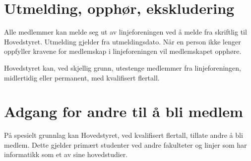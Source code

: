 \section{Utmelding, opphør, ekskludering}
\vspace{23pt}
Alle medlemmer kan melde seg ut av linjeforeningen ved å melde fra skriftlig til Hovedstyret. Utmelding gjelder fra utmeldingsdato. Når en person ikke lenger oppfyller kravene for medlemskap i linjeforeningen vil medlemskapet opphøre.

Hovedstyret kan, ved skjellig grunn, utestenge medlemmer fra linjeforeningen, midlertidig eller permanent, med kvalifisert flertall.


\section{Adgang for andre til å bli medlem}
\vspace{23pt}
På spesielt grunnlag kan Hovedstyret, ved kvalifisert flertall, tillate andre å bli medlem. Dette gjelder primært studenter ved andre fakulteter og linjer som har informatikk som et av sine hovedstudier.
